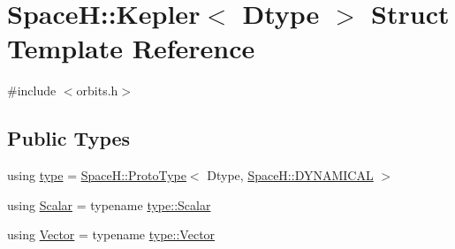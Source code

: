 \hypertarget{struct_space_h_1_1_kepler}{}\section{SpaceH\+:\+:Kepler$<$ Dtype $>$ Struct Template Reference}
\label{struct_space_h_1_1_kepler}


{\ttfamily \#include $<$orbits.\+h$>$}

\subsection*{Public Types}
\begin{DoxyCompactItemize}
\item 
using \mbox{\hyperlink{struct_space_h_1_1_kepler_a34c000d5045014f85cad95306c3d8a9e}{type}} = \mbox{\hyperlink{struct_space_h_1_1_proto_type}{Space\+H\+::\+Proto\+Type}}$<$ Dtype, \mbox{\hyperlink{namespace_space_h_a3e55b9bc2a9e10c08ce8121bce11244a}{Space\+H\+::\+D\+Y\+N\+A\+M\+I\+C\+AL}} $>$
\item 
using \mbox{\hyperlink{struct_space_h_1_1_kepler_a19291f268209f594a96fb4828fa1a54c}{Scalar}} = typename \mbox{\hyperlink{struct_space_h_1_1_proto_type_af3c8245d83d9db64749882920de5c274}{type\+::\+Scalar}}
\item 
using \mbox{\hyperlink{struct_space_h_1_1_kepler_aa0f5e7ecefa626a0e32a9435dd9662cd}{Vector}} = typename \mbox{\hyperlink{struct_space_h_1_1_proto_type_a316b81f4660b2b4fab14a8e1f23b6089}{type\+::\+Vector}}
\end{DoxyCompactItemize}

